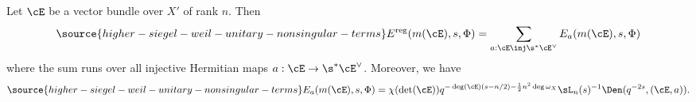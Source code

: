 \begin{thm}
\notready\label{th:Eis Den}
Let $\cE$ be a vector bundle over $X'$ of rank $n$.
Then
\begin{equation}\label{eq:reg}
\source{higher-siegel-weil-unitary-nonsingular-terms}
E^{\rm reg}(m(\cE),s,\Phi)=\sum_{a: \cE\inj \s^{*}\cE^\vee}E_{a}(m(\cE), s,\Phi)
\end{equation}
where the sum runs over all injective Hermitian maps  $a: \cE\to \s^{*}\cE^\vee $. Moreover, we have
\begin{equation}\label{Ea Den}
\source{higher-siegel-weil-unitary-nonsingular-terms}
E_{a}(m(\cE),s,\Phi)=\chi(\det(\cE))q^{-\deg(\cE)( s-n/2)-\frac{1}{2}n^2\deg\omega_X }\sL_n(s) ^{-1} \Den(q^{-2s}, (\cE,a)).
\end{equation}
\end{thm}
